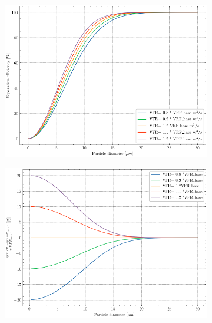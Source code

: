 \begin{figure}[H]
	\centering
	\begin{subfigure}{.49\textwidth}
		\centering
		\includegraphics[width=1.0\linewidth]{images/efficiency_vs_inlet_VFR_porcent.png}
		\caption{}
		\label{inlet_VRF_porcent}
	\end{subfigure}
	\begin{subfigure}{.49\textwidth}
		\centering
		\includegraphics[width=1.0\linewidth]{images/efficiency_vs_inlet_VFR_relative.png}
		\caption{}
		\label{}
	\end{subfigure}
	\captionsetup{font=bf, size=small}
	\caption{ }
	\label{inlet_VRF_relative}
\end{figure}

